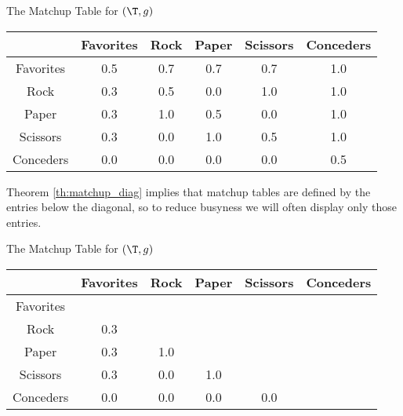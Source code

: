 {    \begin{figg}{The Matchup Table for $(\T, g)$}{}
        \begin{center}
            \begin{tabular}{ c | c c c c c}
            & Favorites & Rock & Paper & Scissors & Conceders\\
            \hline
            Favorites & 0.5 & 0.7 & 0.7 & 0.7 & 1.0\\
            Rock      & 0.3 & 0.5 & 0.0 & 1.0 & 1.0\\
            Paper     & 0.3 & 1.0 & 0.5 & 0.0 & 1.0\\
            Scissors  & 0.3 & 0.0 & 1.0 & 0.5 & 1.0\\
            Conceders & 0.0 & 0.0 & 0.0 & 0.0 & 0.5
            \end{tabular}
        \end{center}
    \end{figg}

    
    
    Theorem \ref{th:matchup_diag} implies that matchup tables are defined by the entries below the diagonal, so to reduce busyness we will often display only those entries.

    \begin{figg}{The Matchup Table for $(\T, g)$}{}
        \begin{center}
            \begin{tabular}{ c | c c c c c}
            & Favorites & Rock & Paper & Scissors & Conceders\\
            \hline
            Favorites & &  &  &  & \\
            Rock      & 0.3 & & &  & \\
            Paper     & 0.3 & 1.0 & & & \\
            Scissors  & 0.3 & 0.0 & 1.0 & & \\
            Conceders & 0.0 & 0.0 & 0.0 & 0.0 &
            \end{tabular}
        \end{center}
    \end{figg}


}
